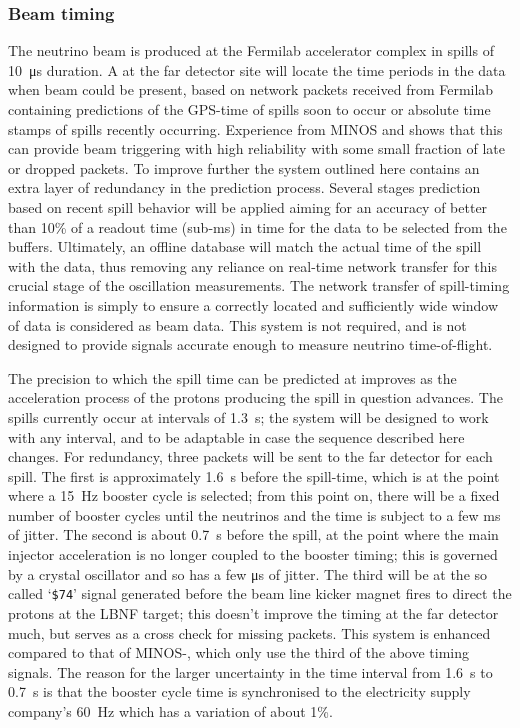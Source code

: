 

\subsubsection{Beam timing}
\label{sec:fd-daq-design-beamtiming}

The neutrino beam is produced at the Fermilab accelerator complex in
spills of \SI{10}{\us} duration. 
A  at the far detector site will locate the time periods in
the data when beam could be present, based on network packets received
from Fermilab containing predictions of the GPS-time of spills soon to
occur or absolute time stamps of spills recently occurring. 
Experience from MINOS and \nova shows that this can provide beam
triggering with high reliability with some small fraction of late or
dropped packets.
To improve further the system outlined here contains an extra layer
of redundancy in the prediction process. 
Several stages prediction based on recent spill behavior will be applied aiming
for an accuracy of better than 10\% of a readout
time (sub-\si{\ms}) in time for the data to be selected from
the  buffers. 
Ultimately, an offline database will match the actual time of the
spill with the data, thus removing any reliance on real-time network
transfer for this crucial stage of the oscillation measurements. The
network transfer of spill-timing information is simply to ensure a
correctly located and sufficiently wide window of data is considered
as beam data. This system is not required, and is not designed to
provide signals accurate enough to measure neutrino time-of-flight.

The precision to which the spill time can be predicted at \fnal
improves as the acceleration process of the protons producing the
spill in question advances.  The spills currently occur at intervals
of \SI{1.3}{\s}; the system will be designed to work with any interval, and
to be adaptable in case the sequence described here changes.  For
redundancy, three packets will be sent to the far detector for each
spill.  The first is approximately \SI{1.6}{\s} before the spill-time, which
is at the point where a \SI{15}{\Hz} booster cycle is selected; from this
point on, there will be a fixed number of booster cycles until the
neutrinos and the time is subject to a few ms of jitter.  The second
is about \SI{0.7}{\s} before the spill, at the point where the main injector
acceleration is no longer coupled to the booster timing; this is
governed by a crystal oscillator and so has a few \si{\us} of jitter.
The third will be at the so called `\texttt{\$74}' signal generated before the beam line kicker magnet fires
to direct the protons at the LBNF target; this doesn't improve the
timing at the far detector much, but serves as a cross check for
missing packets.  This system is enhanced compared to that of
MINOS-\nova, which only use the third of the above timing signals.  The
reason for the larger uncertainty in the time interval from \SI{1.6}{\s} to
\SI{0.7}{\s} is that the booster cycle time is synchronised to the
electricity supply company's \SI{60}{\Hz} which has a variation of about
1\%.

